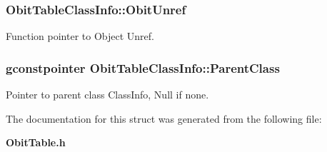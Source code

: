 \subsubsection{ {\bf Obit\-Table\-Class\-Info::Obit\-Unref}}\label{structObitTableClassInfo_o11}


Function pointer to Object Unref. 

\subsubsection{\setlength{\rightskip}{0pt plus 5cm}gconstpointer {\bf Obit\-Table\-Class\-Info::Parent\-Class}}\label{structObitTableClassInfo_o3}


Pointer to parent class Class\-Info, Null if none. 



The documentation for this struct was generated from the following file:\begin{CompactItemize}
\item 
{\bf Obit\-Table.h}\end{CompactItemize}
